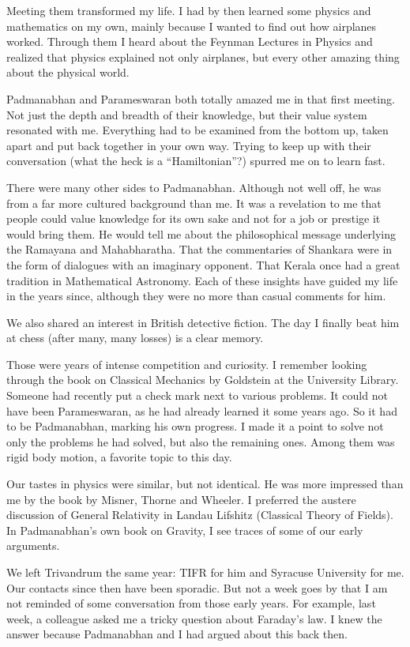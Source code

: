 \documentclass[prd, preprint, longbibliography, 12pt]{revtex4-2}
\begin{document}
Meeting them transformed my life. I had by then learned some physics and mathematics on my own, mainly because I wanted to find out how airplanes worked. Through them I heard about the Feynman Lectures in Physics and realized that physics explained not only airplanes, but every other amazing thing about the physical world.

Padmanabhan  and Parameswaran both totally amazed me  in that first meeting. Not just the depth and breadth of their knowledge, but their value system resonated with me. Everything had to be examined from the bottom up, taken apart and put back together in your own way. Trying to keep up with their conversation (what the heck is a “Hamiltonian”?) spurred me on to learn fast.

There were many other sides to Padmanabhan. Although not well off, he was from a far more  cultured background than me. It was a revelation to me that people could value knowledge for its own sake and not for a job or prestige it would bring them. He would tell me about the philosophical message underlying the Ramayana and Mahabharatha. That the commentaries of Shankara were in the form of dialogues with an imaginary opponent. That Kerala once had a great tradition in Mathematical Astronomy. Each of these insights have guided my life in the years since, although they were no more than casual comments for him.

We also shared an  interest in British detective fiction. The day I finally beat him at chess (after many, many losses) is a clear memory.

Those were years of intense competition and curiosity. I remember looking through the book on Classical Mechanics by Goldstein at the University Library. Someone had recently put a check mark next to various problems. It could not have been Parameswaran, as he had already learned it some years ago. So it had to be Padmanabhan, marking his own progress. I made it a point to solve not only the problems he had solved, but also the remaining ones. Among them was rigid body motion, a favorite topic to this day.

Our tastes in physics were similar, but not identical. He was more impressed than me by the   book by Misner, Thorne and Wheeler. I preferred the austere discussion of General Relativity in Landau Lifshitz (Classical Theory of Fields). In Padmanabhan's own book on Gravity, I see traces of some of our early arguments.

We left Trivandrum the same year: TIFR for him and Syracuse University for me. Our contacts since then have been sporadic. But not a week goes by that I am not reminded of some conversation from those early years. For example, last week, a colleague asked me a tricky question about Faraday's law. I knew the answer because Padmanabhan and I had argued about this back then.
\end{document}
